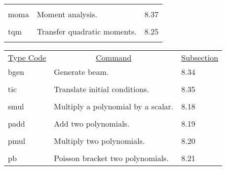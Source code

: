 \begin{center}
\begin{tabular}{lll}
\vspace{-3mm}& &\\
\hspace{1.5em}moma      &         Moment analysis.  &   \hspace{2em}8.37\\
\vspace{-3mm}& &\\
\hspace{1.5em}tqm  & Transfer quadratic moments. & \hspace{2em}8.25\\
\vspace{-3mm}& &\\
\end{tabular}


\begin{tabular}{lll}
\multicolumn{1}{c}{\underline{Type Code}} &
\multicolumn{1}{c}{\underline{Command}}   &
\multicolumn{1}{c}{\underline{Subsection}} \\
\hspace{1.5em}bgen    &     Generate beam.                       &   \hspace{2em}8.34\\
\vspace{-3mm}& &\\
\hspace{1.5em}tic     &    Translate initial conditions.         &  \hspace{2em}8.35\\
\vspace{-3mm}& &\\
\hspace{1.5em}smul    &      Multiply a polynomial by a scalar.   & \hspace{2em}8.18\\
\vspace{-3mm}& &\\
\hspace{1.5em}padd    &           Add two polynomials.       &   \hspace{2em}8.19\\
\vspace{-3mm}& &\\
\hspace{1.5em}pmul    &           Multiply two polynomials.   &    \hspace{2em}8.20\\
\vspace{-3mm}& &\\
\hspace{1.5em}pb      &         Poisson bracket two polynomials. &  \hspace{2em}8.21\\

\end{tabular}
\end{center}
